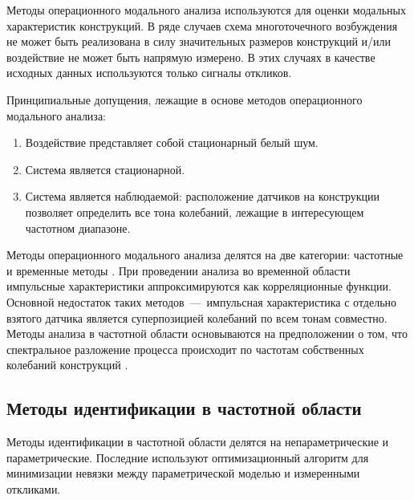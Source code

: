 Методы операционного модального анализа используются для оценки модальных характеристик конструкций. В ряде случаев схема многоточечного возбуждения не может быть реализована в силу значительных размеров конструкций и/или воздействие не может быть напрямую измерено. В этих случаях в качестве исходных данных используются только сигналы откликов. 

Принципиальные допущения, лежащие в основе методов операционного модального анализа:
\begin{enumerate}[noitemsep]
	\item Воздействие представляет собой стационарный белый шум.
	\item Система является стационарной.
	\item Система является наблюдаемой: расположение датчиков на конструкции позволяет определить все тона колебаний, лежащие в интересующем частотном диапазоне. 
\end{enumerate}

Методы операционного модального анализа делятся на две категории: частотные и временные методы \cite{lib:oma:Magalhaes}. При проведении анализа во временной области импульсные характеристики аппроксимируются как корреляционные функции. Основной недостаток таких методов~---~импульсная характеристика с отдельно взятого датчика является суперпозицией колебаний по всем тонам совместно. Методы анализа в частотной области основываются на предположении о том, что спектральное разложение процесса происходит по частотам собственных колебаний конструкций \cite{lib:oma:Brincker}. 

\subsection{Методы идентификации в частотной области}

Методы идентификации в частотной области  делятся на непараметрические и параметрические. Последние используют оптимизационный алгоритм для минимизации невязки между параметрической моделью и измеренными откликами. 

